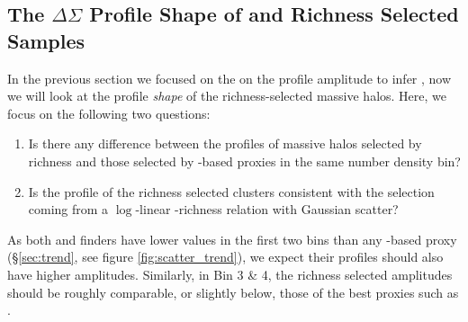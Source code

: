 \documentclass[fleqn,usenatbib,useAMS,english]{mnras}
\begin{document}
\subsection{The $\Delta\Sigma$ Profile Shape of \mstar{} and Richness Selected Samples}
    \label{sec:mstar_vs_richness}

    In the previous section we focused on the on the \dsigma{} profile amplitude
    to infer \sigmvir{}, now we will look at the profile {\em shape} of the
    richness-selected massive halos.
    Here, we focus on the following two questions:

    \begin{enumerate}

        \item Is there any difference between the \dsigma{} profiles of massive halos selected by
            richness and those selected by \mstar{}-based proxies in the same number density bin?

        \item Is the \dsigma{} profile of the richness selected clusters consistent with the
            selection coming from a $\log$-linear \mvir{}-richness relation with Gaussian scatter?

    \end{enumerate}

    As both \redm{} and \camira{} finders have lower \sigmvir{} values in the first two
    \topn{} bins than any \mstar{}-based proxy (\S \ref{sec:trend}, see figure
    \ref{fig:scatter_trend}), we expect their \dsigma{} profiles should also have higher
    amplitudes.
    Similarly, in Bin 3 \& 4, the richness selected \dsigma{} amplitudes should be roughly
    comparable, or slightly below, those of the best \mstar{} proxies such as .
\end{document}
